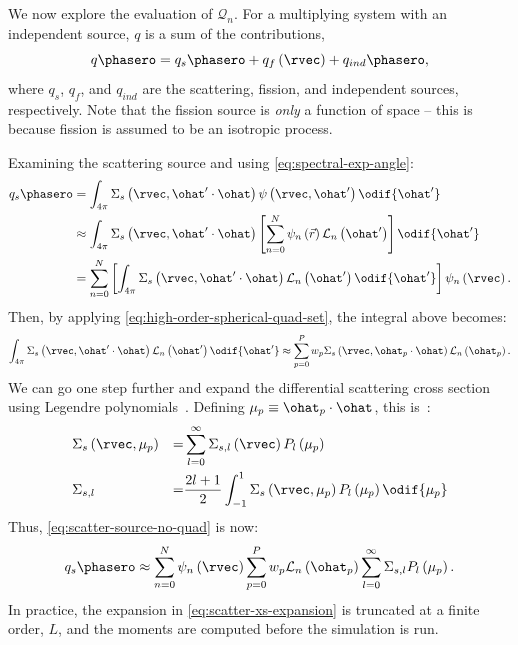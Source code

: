 We now explore the evaluation of $\mathcal{Q}_n$.
For a multiplying system with an independent source, $q$ is a sum of the contributions,
\begin{equation}
  q\phasero = q_s\phasero + q_f\left(\rvec\right)+q_{ind}\phasero,
\end{equation}
where $q_s$, $q_f$, and $q_{ind}$ are the scattering, fission, and independent sources, respectively.
Note that the fission source is \emph{only} a function of space -- this is because fission is assumed to be an isotropic process.

Examining the scattering source and using \cref{eq:spectral-exp-angle}:
\begin{equation}
  \label{eq:scatter-source-no-quad}
  \begin{split}
    q_{s}\phasero & = \int_{4\pi}\Sigma_s\left(\rvec,\ohat'\cdot\ohat\right)\psi\left(\rvec,\ohat'\right)\odif{\ohat'}                                                                 \\
                  & \approx\int_{4\pi}\Sigma_s\left(\rvec,\ohat'\cdot\ohat\right)\left[\sum_{n=0}^N\psi_{n}\left(\vec{r}\right)\mathcal{L}_{n}\left(\ohat'\right)\right] \odif{\ohat'} \\
                  & =\sum_{n=0}^N\left[\int_{4\pi}\Sigma_s\left(\rvec,\ohat'\cdot\ohat\right)\mathcal{L}_{n}\left(\ohat'\right)\odif{\ohat'}\right]\psi_n\left(\rvec\right).
  \end{split}
\end{equation}
Then, by applying \cref{eq:high-order-spherical-quad-set}, the integral above becomes:
\begin{equation}
  \int_{4\pi}\Sigma_s\left(\rvec,\ohat'\cdot\ohat\right)\mathcal{L}_{n}\left(\ohat'\right)\odif{\ohat'}  \approx \sum_{p=0}^P w_p \Sigma_s\left(\rvec,\ohat_p\cdot \ohat\right)\mathcal{L}_{n}\left(\ohat_p\right).
\end{equation}
We can go one step further and expand the differential scattering cross section using Legendre polynomials~\cite{larsenAdvancesDiscreteOrdinatesMethodology2010}.
Defining $\mu_p\equiv \ohat_p\cdot\ohat$, this is~\cite{bellNuclearReactorTheory1970}:
\begin{equation}
  \label{eq:scatter-xs-expansion}
  \begin{aligned}
     & \Sigma_s\left(\rvec,\mu_p\right) & = & \sum_{l=0}^{\infty}\Sigma_{s,l}\left(\rvec\right)P_l\left(\mu_p\right)                       \\
     & \Sigma_{s,l}                     & = & \frac{2l+1}{2}\int_{-1}^{1}\Sigma_s\left(\rvec,\mu_p\right)P_l\left(\mu_p\right)\odif{\mu_p}
  \end{aligned}
\end{equation}
Thus, \cref{eq:scatter-source-no-quad} is now:
\begin{equation}
  \label{eq:wrldo-scatter-source}
  q_s\phasero\approx\sum_{n=0}^N\psi_{n}\left(\rvec\right)\sum_{p=0}^{P}w_p\mathcal{L}_{n}\left(\ohat_p\right)\sum_{l=0}^{\infty}\Sigma_{s,l}P_l\left(\mu_p\right).
\end{equation}
In practice, the expansion in \cref{eq:scatter-xs-expansion} is truncated at a finite order, $L$, and the moments are computed before the simulation is run.

